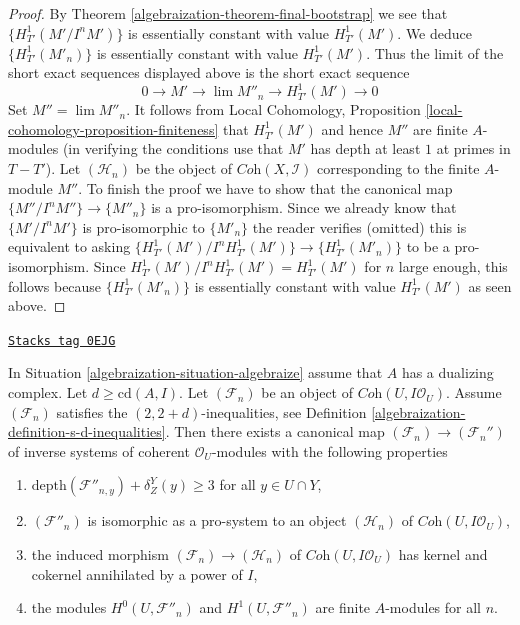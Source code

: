 \begin{proof}
\medskip\noindent
By Theorem \ref{algebraization-theorem-final-bootstrap} we see that $\{H^1_{T'}(M'/I^nM')\}$
is essentially constant with value $H^1_{T'}(M')$. We deduce
$\{H^1_{T'}(M'_n)\}$ is essentially constant with value $H^1_{T'}(M')$.
Thus the limit of the short exact sequences displayed above
is the short exact sequence
$$
0 \to M' \to \lim M''_n \to H^1_{T'}(M') \to 0
$$
Set $M'' = \lim M''_n$. It follows from
Local Cohomology, Proposition \ref{local-cohomology-proposition-finiteness}
that $H^1_{T'}(M')$ and hence $M''$ are finite $A$-modules (in verifying the
conditions use that $M'$ has depth at least $1$ at primes in $T - T'$).
Let $(\mathcal{H}_n)$ be the object of $\textit{Coh}(X, \mathcal{I})$
corresponding to the finite $A$-module $M''$. To finish the proof we have
to show that the canonical map $\{M''/I^nM''\} \to \{M''_n\}$ is a
pro-isomorphism. Since we already know that $\{M'/I^nM'\}$ is pro-isomorphic
to $\{M'_n\}$ the reader verifies (omitted) this is equivalent to asking
$\{H^1_{T'}(M')/I^nH^1_{T'}(M')\} \to \{H^1_{T'}(M'_n)\}$
to be a pro-isomorphism. Since $H^1_{T'}(M')/I^nH^1_{T'}(M') = H^1_{T'}(M')$
for $n$ large enough, this follows because $\{H^1_{T'}(M'_n)\}$
is essentially constant with value $H^1_{T'}(M')$ as seen above.
\end{proof}

\begin{lemma}
\label{algebraization-lemma-improvement-application}
\href{https://stacks.math.columbia.edu/tag/0EJG}{\texttt{Stacks tag 0EJG}}

In Situation \ref{algebraization-situation-algebraize} assume that $A$ has
a dualizing complex. Let $d \geq \text{cd}(A, I)$. Let $(\mathcal{F}_n)$
be an object of $\textit{Coh}(U, I\mathcal{O}_U)$. Assume
$(\mathcal{F}_n)$ satisfies the $(2, 2 + d)$-inequalities, see
Definition \ref{algebraization-definition-s-d-inequalities}.
Then there exists a canonical map $(\mathcal{F}_n) \to (\mathcal{F}_n'')$
of inverse systems of coherent $\mathcal{O}_U$-modules
with the following properties
\begin{enumerate}
\item $\text{depth}(\mathcal{F}''_{n, y}) + \delta^Y_Z(y) \geq 3$
for all $y \in U \cap Y$,
\item $(\mathcal{F}''_n)$ is isomorphic as a pro-system to an object
$(\mathcal{H}_n)$ of $\textit{Coh}(U, I\mathcal{O}_U)$,
\item the induced morphism $(\mathcal{F}_n) \to (\mathcal{H}_n)$ of
$\textit{Coh}(U, I\mathcal{O}_U)$ has kernel and cokernel
annihilated by a power of $I$,
\item the modules $H^0(U, \mathcal{F}''_n)$ and $H^1(U, \mathcal{F}''_n)$
are finite $A$-modules for all $n$.
\end{enumerate}
\end{lemma}

